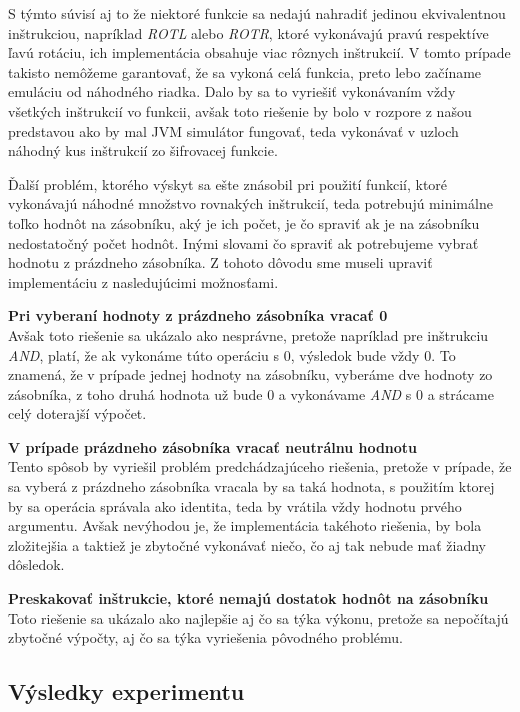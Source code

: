 S týmto súvisí aj to že niektoré funkcie sa nedajú nahradiť jedinou ekvivalentnou inštrukciou, napríklad \textit{ROTL} alebo \textit{ROTR}, ktoré vykonávajú pravú respektíve ľavú rotáciu, ich implementácia obsahuje viac rôznych inštrukcií. V tomto prípade takisto nemôžeme garantovať, že sa vykoná celá funkcia, preto lebo začíname emuláciu od náhodného riadka. Dalo by sa to vyriešiť vykonávaním vždy všetkých inštrukcií vo funkcii, avšak toto riešenie by bolo v rozpore z našou predstavou ako by mal JVM simulátor fungovať, teda vykonávať v uzloch náhodný kus inštrukcií zo šifrovacej funkcie. 

Ďalší problém, ktorého výskyt sa ešte znásobil pri použití funkcií, ktoré vykonávajú náhodné množstvo rovnakých inštrukcií, teda potrebujú minimálne toľko hodnôt na zásobníku, aký je ich počet, je čo spraviť ak je na zásobníku nedostatočný počet hodnôt. Inými slovami čo spraviť ak potrebujeme vybrať hodnotu z prázdneho zásobníka. Z tohoto dôvodu sme museli upraviť implementáciu z nasledujúcimi možnosťami.

\begin{myItemize}
 \item \textbf{Pri vyberaní hodnoty z prázdneho zásobníka vracať 0}\\Avšak toto riešenie sa ukázalo ako nesprávne, pretože napríklad pre inštrukciu \textit{AND}, platí, že ak vykonáme túto operáciu s 0, výsledok bude vždy 0. To znamená, že v prípade jednej hodnoty na zásobníku, vyberáme dve hodnoty zo zásobníka, z toho druhá hodnota už bude 0 a vykonávame \textit{AND} s 0 a strácame celý doterajší výpočet.
 \item \textbf{V prípade prázdneho zásobníka vracať neutrálnu hodnotu}\\Tento spôsob by vyriešil problém predchádzajúceho riešenia, pretože v prípade, že sa vyberá z prázdneho zásobníka vracala by sa taká hodnota, s použitím ktorej by sa operácia správala ako identita, teda by vrátila vždy hodnotu prvého argumentu. Avšak nevýhodou je, že implementácia takéhoto riešenia, by bola zložitejšia a taktiež je zbytočné vykonávať niečo, čo aj tak nebude mať žiadny dôsledok. 
 \item \textbf{Preskakovať inštrukcie, ktoré nemajú dostatok hodnôt na zásobníku}\\Toto riešenie sa ukázalo ako najlepšie aj čo sa týka výkonu, pretože sa nepočítajú zbytočné výpočty, aj čo sa týka vyriešenia pôvodného problému.  
\end{myItemize}

\subsection{Výsledky experimentu}
\label{subsec:exp1-results}

